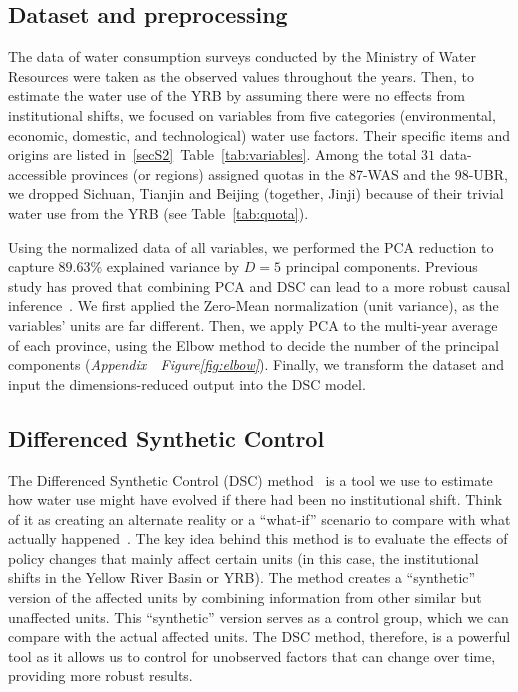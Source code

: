 \subsection{Dataset and preprocessing}\label{sec:dataset}
The data of water consumption surveys conducted by the Ministry of Water Resources were taken as the observed values throughout the years.
Then, to estimate the water use of the YRB by assuming there were no effects from institutional shifts, we focused on variables from five categories (environmental, economic, domestic, and technological) water use factors. Their specific items and origins are listed in~\ref{secS2}~Table~\ref{tab:variables}.
Among the total $31$ data-accessible provinces (or regions) assigned quotas in the 87-WAS and the 98-UBR, we dropped Sichuan, Tianjin and Beijing (together, Jinji) because of their trivial water use from the YRB (see Table~\ref{tab:quota}).

Using the normalized data of all variables, we performed the PCA reduction to capture $89.63\%$ explained variance by $D = 5$ principal components.
Previous study has proved that combining PCA and DSC can lead to a more robust causal inference~\cite{bayani2021}.
We first applied the Zero-Mean normalization (unit variance), as the variables' units are far different. Then, we apply PCA to the multi-year average of each province, using the Elbow method to decide the number of the principal components (\textit{Appendix~~Figure\ref{fig:elbow}}).
Finally, we transform the dataset and input the dimensions-reduced output into the DSC model.

\subsection{Differenced Synthetic Control}\label{sec:DSC}

The Differenced Synthetic Control (DSC) method~\cite{arkhangelsky2021} is a tool we use to estimate how water use might have evolved if there had been no institutional shift.
Think of it as creating an alternate reality or a ``what-if'' scenario to compare with what actually happened~\cite{abadie2010, abadie2015, hill2021}.
The key idea behind this method is to evaluate the effects of policy changes that mainly affect certain units (in this case, the institutional shifts in the Yellow River Basin or YRB).
The method creates a ``synthetic'' version of the affected units by combining information from other similar but unaffected units. This ``synthetic'' version serves as a control group, which we can compare with the actual affected units.
The DSC method, therefore, is a powerful tool as it allows us to control for unobserved factors that can change over time, providing more robust results.


